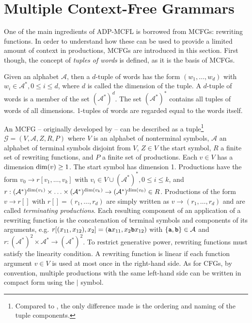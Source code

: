 \documentclass[
    a4paper,
    12pt,
    twoside,
    BCOR=12mm,
    parskip=half,
    chapterprefix,
    numbers=noenddot,
    bibliography=totoc
]{scrbook}
\begin{document}
\newpage
  
\section{Multiple Context-Free Grammars}
\label{sec:mcfgs}

One of the main ingredients of ADP-MCFL is borrowed from \glspl{MCFG}: rewriting functions. In order to understand how these can be used to provide a limited amount of context in productions, \glspl{MCFG} are introduced in this section. First though, the concept of \emph{tuples of words} is defined, as it is the basis of \glspl{MCFG}.

\begin{definition}
	Given an alphabet $\mathcal{A}$, then a $d$-tuple of words has the form $(w_1,\ldots,w_d)$ with $w_i \in \mathcal{A}^*, 0 \leq i \leq d$, where $d$ is called the dimension of the tuple. A $d$-tuple of words is a member of the set $(\mathcal{A}^*)^d$. The set $(\mathcal{A}^*)^*$ contains all tuples of words of all dimensions. 1-tuples of words are regarded equal to the words itself.
\end{definition}

An \gls{MCFG} -- originally developed by \citet{seki_multiple_1991} -- can be described \citep{seki_generative_2008} as a tuple\footnote{Compared to \citet{seki_generative_2008}, the only difference made is the ordering and naming of the tuple components.} $\mathcal{G}=(V,\mathcal{A},Z,R,P)$ where $V$ is an alphabet of nonterminal symbols, $\mathcal{A}$ an alphabet of terminal symbols disjoint from $V$, $Z \in V$ the start symbol, $R$ a finite set of rewriting functions, and $P$ a finite set of productions. 
Each $v \in V$ has a dimension $\mathrm{dim}(v) \geq 1$. The start symbol has dimension 1. Productions have the form $v_0 \to r[v_1,\ldots,v_k]$ with $v_i \in V \cup (\mathcal{A}^*)^*, 0 \leq i \leq k$, and $r: (\mathcal{A}^*)^{\mathrm{dim}(v_1)} \times \ldots \times (\mathcal{A}^*)^{\mathrm{dim}(v_k)} \to (\mathcal{A}^*)^{\mathrm{dim}(v_0)} \in R$. Productions of the form $v \to r[]$ with $r[]=(r_1,\ldots,r_d)$ are simply written as $v \to (r_1,\ldots,r_d)$ and are called \emph{terminating productions}. Each resulting component of an application of a rewriting function is the concatenation of terminal symbols and components of its arguments, e.g. $r[(x_{11},x_{12}),x_2]=(\ts{a}x_{11},x_2\ts{b}x_{12})$ with $\{\ts{a},\ts{b}\}\in\mathcal{A}$ and $r: (\mathcal{A}^*)^2 \times \mathcal{A}^* \to (\mathcal{A}^*)^2$. To restrict generative power, rewriting functions must satisfy the linearity condition. A rewriting function is linear if each function argument $v \in V$ is used at most once in the right-hand side. As for \glspl{CFG}, by convention, multiple productions with the same left-hand side can be written in compact form using the $|$ symbol.
\end{document}
